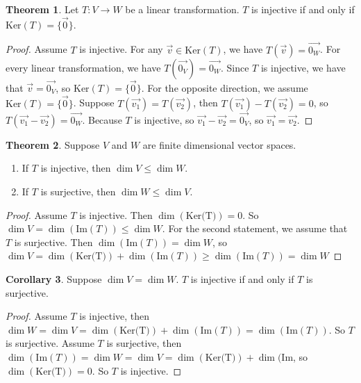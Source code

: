 \documentclass{article}
\theoremstyle{definition}
\newtheorem{theorem}{Theorem}[section]
\newtheorem{corollary}[theorem]{Corollary}
\theoremstyle{remark}
\begin{document}
\begin{theorem}
    Let $T:V\rightarrow W$ be a linear transformation. 
    $T$ is injective if and only if $\text{Ker}(T)=\{\vec{0}\}$.
\end{theorem}

\begin{proof}
    Assume $T$ is injective. 
    For any $\vec{v}\in \text{Ker}(T)$, we have $T(\vec{v})=\vec{0_W}$.
    For every linear transformation, we have $T(\vec{0_V})=\vec{0_W}$.
    Since $T$ is injective, we have that $\vec{v}=\vec{0_V}$, so $\text{Ker}(T)=\{\vec{0}\}$.
    For the opposite direction, we assume $\text{Ker}(T)=\{\vec{0}\}$.
    Suppose $T(\vec{v_1})=T(\vec{v_2})$, then $T(\vec{v_1})-T(\vec{v_2})=0$, so $T(\vec{v_1}-\vec{v_2})=\vec{0_W}$.
    Because $T$ is injective, so $\vec{v_1}-\vec{v_2}=\vec{0_V}$, so $\vec{v_1}=\vec{v_2}$.
\end{proof}

\begin{theorem}
    Suppose $V$ and $W$ are finite dimensional vector spaces.
    \begin{enumerate}
        \item If $T$ is injective, then $\dim V\leq\dim W$.
        \item If $T$ is surjective, then $\dim W\leq\dim V$.
    \end{enumerate}
\end{theorem}

\begin{proof}
    Assume $T$ is injective. 
    Then $\dim(\text{Ker(T)})=0$. 
    So $\dim V=\dim(\text{Im}(T))\leq\dim W$.
    For the second statement, we assume that $T$ is surjective.
    Then $\dim(\text{Im}(T))=\dim W$, so $\dim V=\dim(\text{Ker(T)})+\dim(\text{Im}(T))\geq\dim(\text{Im}(T))=\dim W$
\end{proof}

\begin{corollary}
    Suppose $\dim V=\dim W$.
    $T$ is injective if and only if $T$ is surjective.
\end{corollary}

\begin{proof}
    Assume $T$ is injective, then $\dim W=\dim V=\dim(\text{Ker(T)})+\dim(\text{Im}(T))=\dim(\text{Im}(T))$.
    So $T$ is surjective.
    Assume $T$ is surjective, then $\dim(\text{Im}(T))=\dim W=\dim V=\dim(\text{Ker(T)})+\dim(\text{Im}$, so $\dim(\text{Ker(T)})=0$. 
    So $T$ is injective.
\end{proof}
\end{document}
